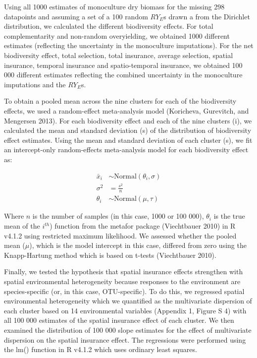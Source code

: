 \documentclass[
  letterpaper,
  DIV=11,
  numbers=noendperiod]{scrartcl}
\begin{document}
Using all 1000 estimates of monoculture dry biomass for the missing 298
datapoints and assuming a set of a 100 random \(RY_{E}\)s drawn a from
the Dirichlet distribution, we calculated the different biodiversity
effects. For total complementarity and non-random overyielding, we
obtained 1000 different estimates (reflecting the uncertainty in the
monoculture imputations). For the net biodiversity effect, total
selection, total insurance, average selection, spatial insurance,
temporal insurance and spatio-temporal insurance, we obtained 100 000
different estimates reflecting the combined uncertainty in the
monoculture imputations and the \(RY_{E}\)s.

To obtain a pooled mean across the nine clusters for each of the
biodiversity effects, we used a random-effect meta-analysis model
(Koricheva, Gurevitch, and Mengersen 2013). For each biodiversity effect
and each of the nine clusters (i), we calculated the mean and standard
deviation (s) of the distribution of biodiversity effect estimates.
Using the mean and standard deviation of each cluster (s), we fit an
intercept-only random-effects meta-analysis model for each biodiversity
effect as:

\[
\begin{aligned}
\bar{x}_i &\sim \text{Normal}(\theta_i, \sigma) \\
\sigma^2 &= \frac{s^2}{n} \\
\theta_i &\sim \text{Normal}(\mu, \tau)
\end{aligned} \tag{Meta-analysis model}
\]

Where \(n\) is the number of samples (in this case, 1000 or 100 000),
\(\theta_i\) is the true mean of the \(i^{th}\)) function from the
metafor package (Viechtbauer 2010) in R v4.1.2 using restricted maximum
likelihood. We assessed whether the pooled mean (\(\mu\)), which is the
model intercept in this case, differed from zero using the Knapp-Hartung
method which is based on t-tests (Viechtbauer 2010).

Finally, we tested the hypothesis that spatial insurance effects
strengthen with spatial environmental heterogeneity because responses to
the environment are species-specific (or, in this case, OTU-specific).
To do this, we regressed spatial environmental heterogeneity which we
quantified as the multivariate dispersion of each cluster based on 14
environmental variables (Appendix 1, Figure S 4) with all 100 000
estimates of the spatial insurance effect of each cluster. We then
examined the distribution of 100 000 slope estimates for the effect of
multivariate dispersion on the spatial insurance effect. The regressions
were performed using the lm() function in R v4.1.2 which uses ordinary
least squares.
\end{document}

